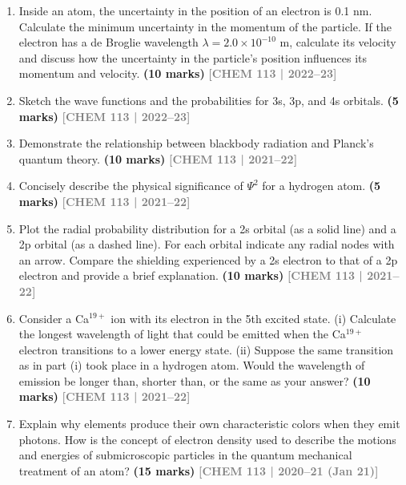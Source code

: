 \documentclass[12pt,a3paper]{article}
\newcommand{\yr}[1]{\hfill\textcolor{gray}{\small\textbf{[#1]}}}
\newcommand{\mk}[1]{\textcolor{orange!70!black}{\small\textbf{(#1 marks)}}}
\begin{document}
\begin{enumerate}
\item Inside an atom, the uncertainty in the position of an electron is 0.1 nm. Calculate the minimum uncertainty in the momentum of the particle. If the electron has a de Broglie wavelength $\lambda = 2.0 \times 10^{-10}$ m, calculate its velocity and discuss how the uncertainty in the particle's position influences its momentum and velocity. \mk{10}
\yr{CHEM 113 | 2022--23}



\item Sketch the wave functions and the probabilities for 3s, 3p, and 4s orbitals. \mk{5}
\yr{CHEM 113 | 2022--23}



\item Demonstrate the relationship between blackbody radiation and Planck's quantum theory. \mk{10}
\yr{CHEM 113 | 2021--22}



\item Concisely describe the physical significance of $\Psi^2$ for a hydrogen atom. \mk{5}
\yr{CHEM 113 | 2021--22}



\item Plot the radial probability distribution for a 2s orbital (as a solid line) and a 2p orbital (as a dashed line). For each orbital indicate any radial nodes with an arrow. Compare the shielding experienced by a 2s electron to that of a 2p electron and provide a brief explanation. \mk{10}
\yr{CHEM 113 | 2021--22}



\item Consider a Ca$^{19+}$ ion with its electron in the 5th excited state. (i) Calculate the longest wavelength of light that could be emitted when the Ca$^{19+}$ electron transitions to a lower energy state. (ii) Suppose the same transition as in part (i) took place in a hydrogen atom. Would the wavelength of emission be longer than, shorter than, or the same as your answer? \mk{10}
\yr{CHEM 113 | 2021--22}



\item Explain why elements produce their own characteristic colors when they emit photons. How is the concept of electron density used to describe the motions and energies of submicroscopic particles in the quantum mechanical treatment of an atom? \mk{15}
\yr{CHEM 113 | 2020--21 (Jan 21)}




\end{enumerate}
\end{document}
